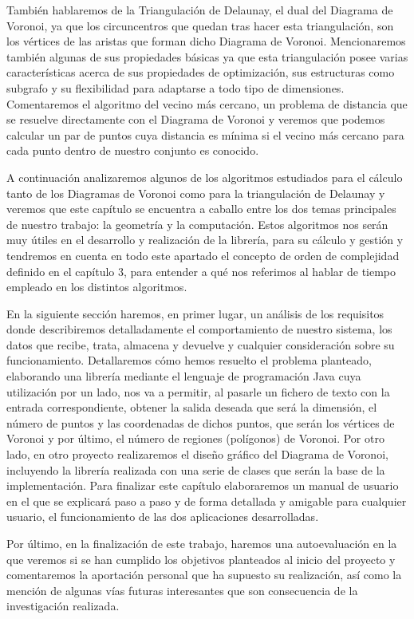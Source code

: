 También hablaremos de la Triangulación de Delaunay, el dual del Diagrama de Voronoi, ya que los circuncentros que quedan tras hacer esta triangulación, son los vértices de las aristas que forman dicho Diagrama de Voronoi. Mencionaremos también algunas de sus propiedades básicas ya que esta triangulación posee varias características acerca de sus propiedades de optimización, sus estructuras como subgrafo y su flexibilidad para adaptarse a todo tipo de dimensiones. Comentaremos el algoritmo del vecino más cercano, un problema de distancia que se resuelve directamente con el Diagrama de Voronoi y veremos que podemos calcular un par de puntos cuya distancia es mínima si el vecino más cercano para cada punto dentro de nuestro conjunto es conocido.

A continuación analizaremos algunos de los algoritmos estudiados para el cálculo tanto de los Diagramas de Voronoi como para la triangulación de Delaunay y veremos que este capítulo se encuentra a caballo entre los dos temas principales de nuestro trabajo: la geometría y la computación. Estos algoritmos nos serán muy útiles en el desarrollo y realización de la librería, para su cálculo y gestión y tendremos en cuenta en todo este apartado el concepto de orden de complejidad definido en el capítulo 3, para entender a qué nos referimos al hablar de tiempo empleado en los distintos algoritmos. 

En la siguiente sección haremos, en primer lugar, un análisis de los requisitos donde describiremos detalladamente el comportamiento de nuestro sistema, los datos que recibe, trata, almacena y devuelve y cualquier consideración sobre su funcionamiento. Detallaremos cómo hemos resuelto el problema planteado, elaborando una librería mediante el lenguaje de programación Java cuya utilización por un lado, nos va a permitir, al pasarle un fichero de texto con la entrada correspondiente, obtener la salida deseada que será la dimensión, el número de puntos y las coordenadas de dichos puntos, que serán los vértices de Voronoi y por último, el número de regiones (polígonos) de Voronoi. Por otro lado, en otro proyecto realizaremos el diseño gráfico del Diagrama de Voronoi, incluyendo la librería realizada con una serie de clases que serán la base de la implementación. Para finalizar este capítulo elaboraremos un manual de usuario en el que se explicará paso a paso y de forma detallada y amigable para cualquier usuario, el funcionamiento de las dos aplicaciones desarrolladas. 

Por último, en la finalización de este trabajo, haremos una autoevaluación en la que veremos si se han cumplido los objetivos planteados al inicio del proyecto y comentaremos la aportación personal que ha supuesto su realización, así como la mención de algunas vías futuras interesantes que son consecuencia de la investigación realizada.







